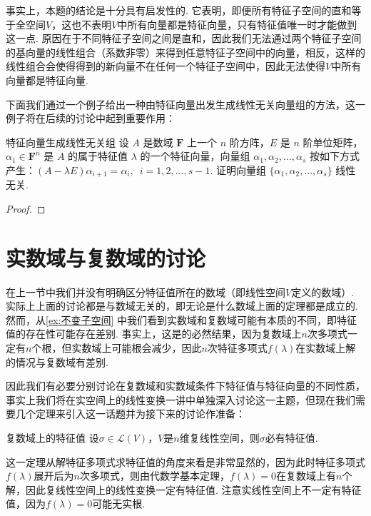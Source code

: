 事实上，本题的结论是十分具有启发性的. 它表明，即便所有特征子空间的直和等于全空间$V$，这也不表明$V$中所有向量都是特征向量，只有特征值唯一时才能做到这一点. 原因在于不同特征子空间之间是直和，因此我们无法通过两个特征子空间的基向量的线性组合（系数非零）来得到任意特征子空间中的向量，相反，这样的线性组合会使得得到的新向量不在任何一个特征子空间中，因此无法使得$V$中所有向量都是特征向量.

下面我们通过一个例子给出一种由特征向量出发生成线性无关向量组的方法，这一例子将在后续的讨论中起到重要作用：
\begin{example}{}{特征向量生成线性无关组}
    设 $A$ 是数域 $\mathbf{F}$ 上一个 $n$ 阶方阵，$E$ 是 $n$ 阶单位矩阵，$\alpha_1 \in \mathbf{F}^n$ 是 $A$ 的属于特征值 $\lambda$ 的一个特征向量，向量组 $\alpha_1,\alpha_2,\ldots,\alpha_s$ 按如下方式产生：$(A-\lambda E)\alpha_{i+1}=\alpha_i,\enspace i=1,2,\ldots,s-1$. 证明向量组 $\{\alpha_1,\alpha_2,\ldots,\alpha_s\}$ 线性无关.
\end{example}

\begin{proof}

\end{proof}

\section{实数域与复数域的讨论}

在上一节中我们并没有明确区分特征值所在的数域（即线性空间$V$定义的数域）. 实际上上面的讨论都是与数域无关的，即无论是什么数域上面的定理都是成立的. 然而，从\autoref{ex:不变子空间} 中我们看到实数域和复数域可能有本质的不同，即特征值的存在性可能存在差别. 事实上，这是的必然结果，因为复数域上$n$次多项式一定有$n$个根，但实数域上可能根会减少，因此$n$次特征多项式$f(\lambda)$在实数域上解的情况与复数域有差别.

因此我们有必要分别讨论在复数域和实数域条件下特征值与特征向量的不同性质，事实上我们将在实空间上的线性变换一讲中单独深入讨论这一主题，但现在我们需要几个定理来引入这一话题并为接下来的讨论作准备：
\begin{theorem}{}{复数域上的特征值}
    设$\sigma\in \mathcal{L}(V)$，$V$是$n$维复线性空间，则$\sigma$必有特征值.
\end{theorem}

这一定理从解特征多项式求特征值的角度来看是非常显然的，因为此时特征多项式$f(\lambda)$展开后为$n$次多项式，则由代数学基本定理，$f(\lambda)=0$在复数域上有$n$个解，因此复线性空间上的线性变换一定有特征值. 注意实线性空间上不一定有特征值，因为$f(\lambda)=0$可能无实根.

